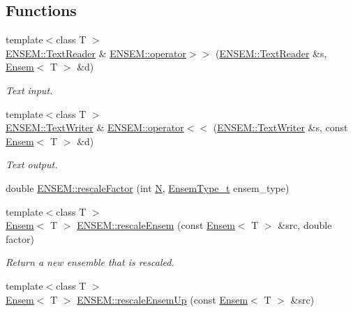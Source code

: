 \subsection*{Functions}
\begin{DoxyCompactItemize}
\item 
{\footnotesize template$<$class T $>$ }\\\mbox{\hyperlink{classENSEM_1_1TextReader}{E\+N\+S\+E\+M\+::\+Text\+Reader}} \& \mbox{\hyperlink{group__eensem_ga607184316d75a7cc8f6e0b082332832e}{E\+N\+S\+E\+M\+::operator$>$$>$}} (\mbox{\hyperlink{classENSEM_1_1TextReader}{E\+N\+S\+E\+M\+::\+Text\+Reader}} \&s, \mbox{\hyperlink{classENSEM_1_1Ensem}{Ensem}}$<$ T $>$ \&d)
\begin{DoxyCompactList}\small\item\em Text input. \end{DoxyCompactList}\item 
{\footnotesize template$<$class T $>$ }\\\mbox{\hyperlink{classENSEM_1_1TextWriter}{E\+N\+S\+E\+M\+::\+Text\+Writer}} \& \mbox{\hyperlink{group__eensem_ga6ec953adfd003a66dd85074b0e1ad399}{E\+N\+S\+E\+M\+::operator$<$$<$}} (\mbox{\hyperlink{classENSEM_1_1TextWriter}{E\+N\+S\+E\+M\+::\+Text\+Writer}} \&s, const \mbox{\hyperlink{classENSEM_1_1Ensem}{Ensem}}$<$ T $>$ \&d)
\begin{DoxyCompactList}\small\item\em Text output. \end{DoxyCompactList}\item 
double \mbox{\hyperlink{group__eensem_ga01418f9a0c64b71fae7f8d400a68f25e}{E\+N\+S\+E\+M\+::rescale\+Factor}} (int \mbox{\hyperlink{adat__devel_2lib_2hadron_2operator__name__util_8cc_a7722c8ecbb62d99aee7ce68b1752f337}{N}}, \mbox{\hyperlink{namespaceENSEM_a2dc2c4a26884f343471e52f23479ddbe}{Ensem\+Type\+\_\+t}} ensem\+\_\+type)
\item 
{\footnotesize template$<$class T $>$ }\\\mbox{\hyperlink{classENSEM_1_1Ensem}{Ensem}}$<$ T $>$ \mbox{\hyperlink{group__eensem_gadbb88f64cff72d8d368551b6de6753f9}{E\+N\+S\+E\+M\+::rescale\+Ensem}} (const \mbox{\hyperlink{classENSEM_1_1Ensem}{Ensem}}$<$ T $>$ \&src, double factor)
\begin{DoxyCompactList}\small\item\em Return a new ensemble that is rescaled. \end{DoxyCompactList}\item 
{\footnotesize template$<$class T $>$ }\\\mbox{\hyperlink{classENSEM_1_1Ensem}{Ensem}}$<$ T $>$ \mbox{\hyperlink{group__eensem_ga30c22a7d0685364385ca870e38bd9b3b}{E\+N\+S\+E\+M\+::rescale\+Ensem\+Up}} (const \mbox{\hyperlink{classENSEM_1_1Ensem}{Ensem}}$<$ T $>$ \&src)

\end{DoxyCompactItemize}
